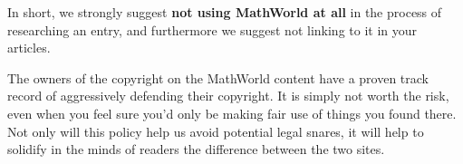In short, we strongly suggest \textbf{not using MathWorld at all} in
the process of researching an entry, and furthermore we suggest not
linking to it in your articles.

The owners of the copyright on the MathWorld content have a proven
track record of aggressively defending their copyright. It is simply
not worth the risk, even when you feel sure you'd only be making fair
use of things you found there. Not only will this policy help us
avoid potential legal snares, it will help to solidify in the minds
of readers the difference between the two sites.

